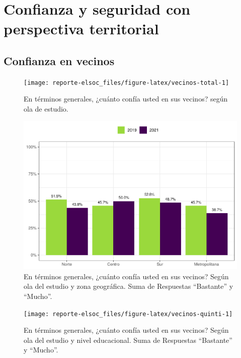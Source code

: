 \documentclass[
  12pt,
  openany]{book}
\begin{document}
\hypertarget{confianza-y-seguridad-con-perspectiva-territorial}{%
\chapter{Confianza y seguridad con perspectiva territorial}\label{confianza-y-seguridad-con-perspectiva-territorial}}

\hypertarget{confianza-en-vecinos}{%
\section{Confianza en vecinos}\label{confianza-en-vecinos}}

\begin{figure}

{\centering \texttt{[image: reporte-elsoc\_files/figure-latex/vecinos-total-1]} 

}

\caption{En términos generales, ¿cuánto confía usted en sus vecinos? según ola de estudio.}\label{fig:vecinos-total}
\end{figure}

\begin{figure}

{\centering \includegraphics{reporte-elsoc_files/figure-latex/vecinos-zona-1} 

}

\caption{En términos generales, ¿cuánto confía usted en sus vecinos? Según ola del estudio y zona geográfica. Suma de Respuestas “Bastante” y “Mucho”.}\label{fig:vecinos-zona}
\end{figure}

\begin{figure}

{\centering \texttt{[image: reporte-elsoc\_files/figure-latex/vecinos-quinti-1]} 

}

\caption{En términos generales, ¿cuánto confía usted en sus vecinos? Según ola del estudio y nivel educacional. Suma de Respuestas “Bastante” y “Mucho”.}\label{fig:vecinos-quinti}
\end{figure}
\end{document}
